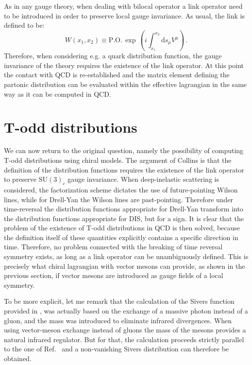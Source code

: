 \documentclass[]{revtex4}
\def\be{\begin{equation}}
\def\ee{\end{equation}}
\begin{document}
As in any gauge theory, when dealing with bilocal operator
a link operator need to be introduced in order to preserve
local gauge invariance. 
As usual, the link is defined to be:
\be
W(x_1,x_2)\equiv 
\mathrm{P.O.}\,\exp\,\left(i\int_{x_1}^{x_2} \mathrm d s_\mu V^\mu\right)\, .
\ee
Therefore, when considering e.g.
a quark distribution function, the gauge invariance of the 
theory requires the existence of the link operator. At this point
the contact with QCD is re-established and the matrix element
defining the partonic distribution can be evaluated within the
effective lagrangian in the same way as it can be computed in QCD. 

\section{T-odd distributions}

We can now return to the original question, namely the 
possibility of computing T-odd distributions using chiral models.
The argument of Collins \cite{Collins:2002kn} is that the 
definition of the distribution functions requires the existence
of the link operator to preserve $\mathrm{SU(3)}_c$ gauge
invariance. When deep-inelastic scattering is considered, 
the factorization scheme dictates the use of
future-pointing Wilson lines, while for Drell-Yan the Wilson
lines are past-pointing. Therefore 
under time-reversal the distribution functions appropriate
for Drell-Yan transform into the distribution functions
appropriate for DIS, but for a sign.
It is clear that  
the problem of the existence of T-odd distributions in QCD
is then solved, because the definition itself of these quantities
explicitly contains a specific direction in time. Therefore, no
problem connected with the breaking of time reversal symmetry exists,
as long as a link operator can be unambiguously defined. 
This is precisely what chiral lagrangian with vector mesons
can provide, as shown in the previous section, if 
vector mesons are introduced as gauge fields of a local symmetry.
 
To be more explicit, let me remark that the calculation of
the Sivers function provided in \cite{Brodsky:2002cx}, was actually
based on the exchange of a massive photon instead of a gluon,
and the mass was introduced to eliminate infrared divergences.
When using vector-meson exchange instead of gluons the mass of
the mesons provides a natural infrared regulator. But for that,
the calculation proceeds strictly parallel to the one of
Ref.~\cite{Brodsky:2002cx} and a non-vanishing Sivers distribution
can therefore be obtained.
\end{document}
